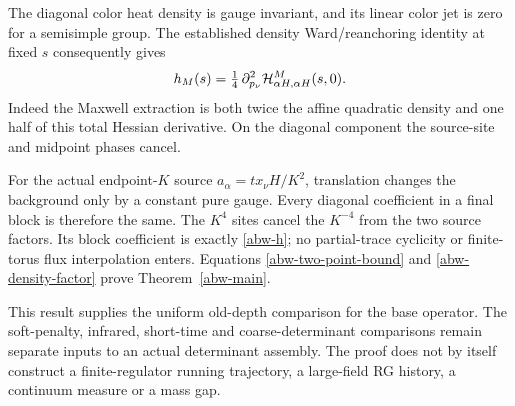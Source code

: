 The diagonal color heat density is gauge invariant, and its linear
color jet is zero for a semisimple group. The established density
Ward/reanchoring identity at fixed \(s\) consequently gives
\begin{equation}
 h_M(s)=\tfrac14\,
 \partial_{p_\nu}^2{\cal H}_{\alpha H,\alpha H}^M(s,0).
 \label{abw-density-factor}
\end{equation}
Indeed the Maxwell extraction is both twice the affine quadratic
density and one half of this total Hessian derivative. On the diagonal
component the source-site and midpoint phases cancel.

For the actual endpoint-\(K\) source \(a_\alpha=t x_\nu H/K^2\),
translation changes the background only by a constant pure gauge.
Every diagonal coefficient in a final block is therefore the same.
The \(K^4\) sites cancel the \(K^{-4}\) from the two source factors.
Its block coefficient is exactly \eqref{abw-h}; no partial-trace
cyclicity or finite-torus flux interpolation enters.
Equations \eqref{abw-two-point-bound} and \eqref{abw-density-factor}
prove Theorem~\ref{abw-main}.

This result supplies the uniform old-depth comparison for the base
operator. The soft-penalty, infrared, short-time and coarse-determinant
comparisons remain separate inputs to an actual determinant assembly.
The proof does not by itself construct a finite-regulator running
trajectory, a large-field RG history, a continuum measure or a mass gap.


